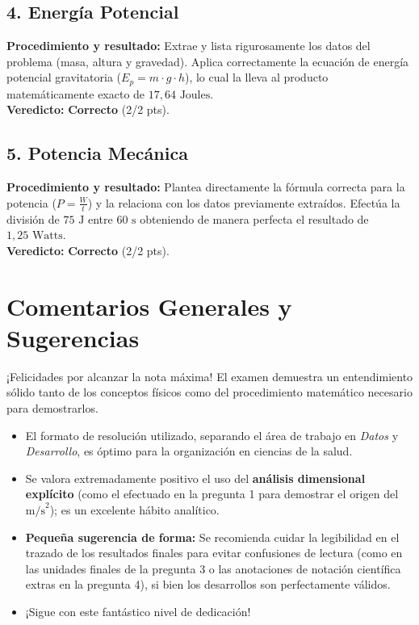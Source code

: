 \documentclass[12pt,letterpaper]{article}
\begin{document}
\subsection*{4. Energía Potencial}
\textbf{Procedimiento y resultado:} Extrae y lista rigurosamente los datos del problema (masa, altura y gravedad). Aplica correctamente la ecuación de energía potencial gravitatoria ($E_p = m \cdot g \cdot h$), lo cual la lleva al producto matemáticamente exacto de $17,64 \text{ Joules}$. \\
\textbf{Veredicto:} \textbf{Correcto} (2/2 pts).

\subsection*{5. Potencia Mecánica}
\textbf{Procedimiento y resultado:} Plantea directamente la fórmula correcta para la potencia ($P = \frac{W}{t}$) y la relaciona con los datos previamente extraídos. Efectúa la división de $75 \text{ J}$ entre $60 \text{ s}$ obteniendo de manera perfecta el resultado de $1,25 \text{ Watts}$. \\
\textbf{Veredicto:} \textbf{Correcto} (2/2 pts).

\vspace{0.5cm}
\section*{Comentarios Generales y Sugerencias}
¡Felicidades por alcanzar la nota máxima! El examen demuestra un entendimiento sólido tanto de los conceptos físicos como del procedimiento matemático necesario para demostrarlos.
\begin{itemize}
    \item El formato de resolución utilizado, separando el área de trabajo en \textit{Datos} y \textit{Desarrollo}, es óptimo para la organización en ciencias de la salud.
    \item Se valora extremadamente positivo el uso del \textbf{análisis dimensional explícito} (como el efectuado en la pregunta 1 para demostrar el origen del $\text{m/s}^2$); es un excelente hábito analítico.
    \item \textbf{Pequeña sugerencia de forma:} Se recomienda cuidar la legibilidad en el trazado de los resultados finales para evitar confusiones de lectura (como en las unidades finales de la pregunta 3 o las anotaciones de notación científica extras en la pregunta 4), si bien los desarrollos son perfectamente válidos.
    \item ¡Sigue con este fantástico nivel de dedicación!
\end{itemize}
\end{document}
